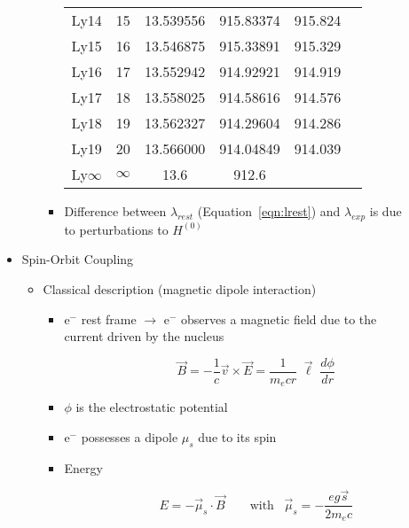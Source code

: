 \documentclass[12pt,letterpaper]{article}
\begin{document}
\begin{Aenumerate}
\begin{itemize}
\begin{itemize}
\begin{itemize}
\begin{table}[ht]
\begin{center}
\begin{tabular}{cccccc}
Ly14&                 15&       13.539556&       915.83374& 915.824\\
Ly15&                 16&       13.546875&       915.33891& 915.329\\
Ly16&                 17&       13.552942&       914.92921& 914.919\\
Ly17&                 18&       13.558025&       914.58616& 914.576\\
Ly18&                 19&       13.562327&       914.29604& 914.286\\
Ly19&                 20&       13.566000&       914.04849& 914.039\\
Ly$\infty$&         $\infty$&   13.6&            912.6    & \\
\hline
\end{tabular}
\end{center}
\end{table}

	\item Difference between $\lambda_{rest}$ (Equation~\ref{eqn:lrest})
	and $\lambda_{exp}$ is due \\ to perturbations to $H^{(0)}$
	\end{itemize}
  \end{itemize}


 \item Spin-Orbit Coupling

	\begin{itemize}
	\item Classical description (magnetic dipole interaction)

		\begin{itemize}
		\item e$^{-}$ rest frame $\to$ e$^{-}$ observes a magnetic field due
		to the \\ current driven by the nucleus

\begin{equation*}
\vec B = - \frac{1}{c} \vec v \times \vec E = \frac{1}{m_e c r} \; \vec \ell \;
\frac{d\phi}{dr}
\end{equation*}

		\item $\phi$ is the electrostatic potential
		\item e$^{-}$ possesses a dipole $\mu_s$ due to its spin
		\item Energy

\begin{equation*}
E = - \vec \mu_s \cdot \vec B  \quad\quad \text{with} \;\;\; 
\vec \mu_s = -\frac{e g \vec s}{2 m_e c}
\end{equation*}


\end{itemize}
\end{itemize}
\end{itemize}
\end{Aenumerate}
\end{document}
